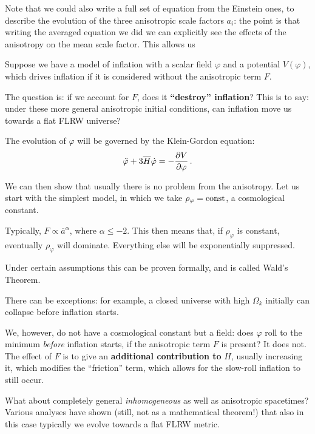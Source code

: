 \documentclass[main.tex]{subfiles}
\begin{document}
Note that we could also write a full set of equation from the Einstein ones, to describe the evolution of the three anisotropic scale factors \(a_i\): the point is that writing the averaged equation we did we can explicitly see the effects of the anisotropy on the mean scale factor. This allows us 

Suppose we have a model of inflation with a scalar field \(\varphi \) and a potential \(V(\varphi )\), which drives inflation if it is considered without the anisotropic term \(F\). 

The question is: if we account for \(F\), does it \textbf{``destroy'' inflation}? 
This is to say: under these more general anisotropic initial conditions, can inflation move us towards a flat FLRW universe? 

The evolution of \(\varphi \) will be governed by the Klein-Gordon equation:
%
\begin{align}
\ddot{\varphi} + 3 \overline{H} \dot{\varphi} = - \pdv{V}{\varphi }
\,.
\end{align}

We can then show that usually there is no problem from the anisotropy. 
Let us start with the simplest model, in which we take \(\rho _\varphi = \text{const}\), a cosmological constant. 

Typically, \(F \propto \overline{a}^{\alpha }\), where \(\alpha \leq -2\). This then means that, if \(\rho _\varphi \) is constant, eventually \(\rho _\varphi \) will dominate. 
Everything else will be exponentially suppressed. 

Under certain assumptions this can be proven formally, and is called Wald's Theorem. 

There can be exceptions: for example, a closed universe with high \(\Omega _k\) initially can collapse before inflation starts. 

We, however, do not have a cosmological constant but a field: does \(\varphi \) roll to the minimum \emph{before} inflation starts, if the anisotropic term \(F\) is present?
It does not. The effect of \(F\) is to give an \textbf{additional contribution to} \(H\), usually increasing it, which modifies the ``friction'' term, which allows for the slow-roll inflation to still occur.

What about completely general \emph{inhomogeneous} as well as anisotropic spacetimes? 
Various analyses have shown (still, not as a mathematical theorem!) that also in this case typically we evolve towards a flat FLRW metric.
\end{document}
